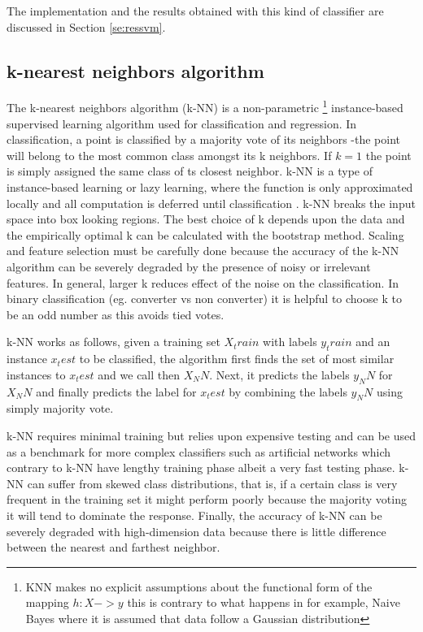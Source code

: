 \documentclass[11pt]{article}
\theoremstyle{definition}
\theoremstyle{remark}
\begin{document}
The implementation and the results obtained with this kind of classifier are discussed in Section \ref{se:ressvm}.

\subsection{k-nearest neighbors algorithm}
\label{sse:kneighbors}

The k-nearest neighbors algorithm (k-NN) is a non-parametric \footnote{KNN makes no explicit assumptions about the functional form of the mapping $h:X->y$ this is contrary to what happens in for example, Naive Bayes where it is assumed that data follow a Gaussian distribution} instance-based supervised learning algorithm used for classification and regression. In classification, a point is classified by a majority vote of its neighbors -the point will belong to the most common class amongst its k neighbors. If $k=1$ the point is simply assigned the same class of ts closest neighbor.
k-NN is a type of instance-based learning or lazy learning, where the function is only approximated locally and all computation is deferred until classification \cite{keller1985fuzzy}. k-NN breaks the input space into box looking regions. The best choice of k depends upon the data and the empirically optimal k can be calculated with the bootstrap method. Scaling and feature selection must be carefully done because the accuracy of the k-NN algorithm can be severely degraded by the presence of noisy or irrelevant features. In general, larger k reduces effect of the noise on the classification. In binary classification (eg. converter vs non converter) it is helpful to choose k to be an odd number as this avoids tied votes.

k-NN works as follows, given a training set $X_train$ with labels $y_train$ and an instance $x_test$ to be classified, the algorithm first  finds the set of most similar instances to $x_test$ and we call then $X_NN$. Next, it predicts the labels $y_NN$ for $X_NN$ and finally predicts the label for $x_test$ by combining the labels $y_NN$ using simply majority vote. 

k-NN requires minimal training but relies upon expensive testing and can be used as a benchmark for more complex classifiers such as artificial networks which contrary to k-NN  have lengthy training phase albeit a very fast testing phase. k-NN can suffer from skewed class distributions, that is, if a certain class is very frequent in the training set it might perform poorly because the majority voting it will tend to dominate the response. Finally, the accuracy of k-NN can be severely degraded with high-dimension data because there is little difference between the nearest and farthest neighbor.
\end{document}
